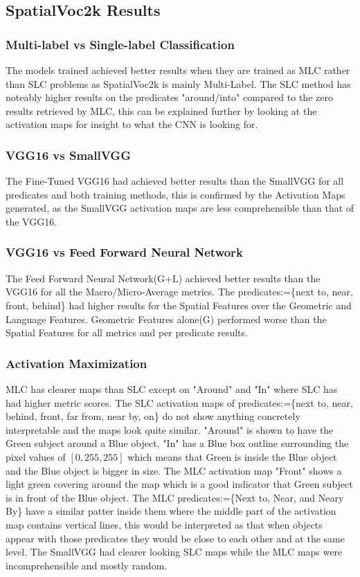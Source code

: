 \documentclass{IEEEtran}
\begin{document}
\subsection{SpatialVoc2k Results}
\subsubsection{Multi-label vs Single-label Classification}
The models trained achieved better results when they are trained as MLC rather than SLC problems as SpatialVoc2k is mainly Multi-Label. The SLC method has noteably higher results on the predicates "around/into" compared to the zero results retrieved by MLC, this can be explained further by looking at the activation maps for insight to what the CNN is looking for. 

\subsubsection{VGG16 vs SmallVGG}
The Fine-Tuned VGG16 had achieved better results than the SmallVGG for all predicates and both training methods, this is confirmed by the Activation Maps generated, as the SmallVGG activation maps are less comprehensible than that of the VGG16.

\subsubsection{VGG16 vs Feed Forward Neural Network}
The Feed Forward Neural Network(G+L) achieved better results than the VGG16 for all the Macro/Micro-Average metrics. The predicates:=\{next to, near, front, behind\} had higher results for the Spatial Features over the Geometric and Language Features. Geometric Features alone(G) performed worse than the Spatial Features for all metrics and per predicate results.

\subsubsection{Activation Maximization}
MLC has clearer maps than SLC except on "Around" and "In" where SLC has had higher metric scores. The SLC activation maps of predicates:=\{next to, near, behind, front, far from, near by, on\} do not show anything concretely interpretable and the maps look quite similar. "Around" is shown to have the Green subject around a Blue object, "In" has a Blue box outline surrounding the pixel values of $[0,255,255]$ which means that Green is inside the Blue object and the Blue object is bigger in size. The MLC activation map "Front" shows a light green covering around the map which is a good indicator that Green subject is in front of the Blue object. The MLC predicates:=\{Next to, Near, and Neary By\} have a similar patter inside them where the middle part of the activation map contains vertical lines, this would be interpreted as that when objects appear with those predicates they would be close to each other and at the same level. The SmallVGG had clearer looking SLC maps while the MLC maps were incomprehensible and mostly random.
 
\end{document}
